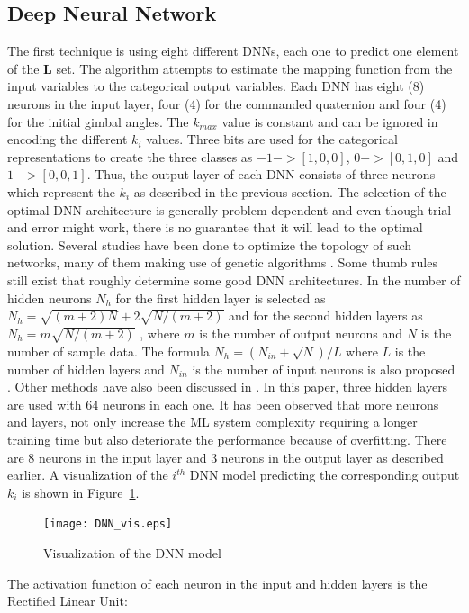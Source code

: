 \documentclass[aerospace,article,submit,moreauthors,dvi2pdf]{Definitions/mdpi}
\begin{document}
\subsection{Deep Neural Network}
The first technique is using eight different DNNs, each one to predict one element of the $\textbf{L}$ set. The algorithm attempts to estimate the mapping function from the input variables to the categorical output variables.
Each DNN has eight (8) neurons in the input layer, four (4) for the commanded quaternion and four (4) for the initial gimbal angles. The  $k_{max}$ value is constant and can be ignored in encoding the different $k_i$ values. Three bits are used for the categorical representations to create the three classes as $-1-> [1,0,0]$, $0->[0,1,0]$ and $1->[0,0,1]$. Thus, the output layer of each DNN consists of three neurons which represent the $k_i$ as described in the previous section. The selection of the optimal DNN architecture is generally problem-dependent and even though trial and error might work, there is no guarantee that it will lead to the optimal solution. Several studies have been done to optimize the topology of such networks, many of them making use of genetic algorithms \cite{DelgadoGA,IdrissiGA,ArifovicGA}. Some thumb rules still exist that roughly determine some good DNN architectures. In \cite{Huang} the number of hidden neurons $N_h$ for the first hidden layer is selected as $N_h=\sqrt{(m+2)N}+2\sqrt{N/(m+2)}$ and for the second hidden layers as $N_h=m\sqrt{N/(m+2)}$ , where $m$ is the number of output neurons and $N$ is the number of sample data. The formula $N_h=(N_{in}+\sqrt{N})/L$ where $L$ is the number of hidden layers and $N_{in}$ is the number of input neurons is also proposed \cite{Ke}. Other methods have also been discussed in \cite{Shibata,Doukim,Yuan}. In this paper, three hidden layers are used with 64 neurons in each one. It has been observed that more neurons and layers, not only increase the ML system complexity requiring a longer training time but also deteriorate the performance because of overfitting. There are 8 neurons in the input layer and 3 neurons in the output layer as described earlier.
A visualization of the $i^{th}$ DNN model predicting the corresponding output $k_i$ is shown in Figure~\ref{fig:DNN_vis}.
\begin{figure}[H]
\texttt{[image: DNN\_vis.eps]}
\caption{\label{fig:DNN_vis}Visualization of the DNN model}
\end{figure}

The activation function of each neuron in the input and hidden layers is the Rectified Linear Unit:
\end{document}
